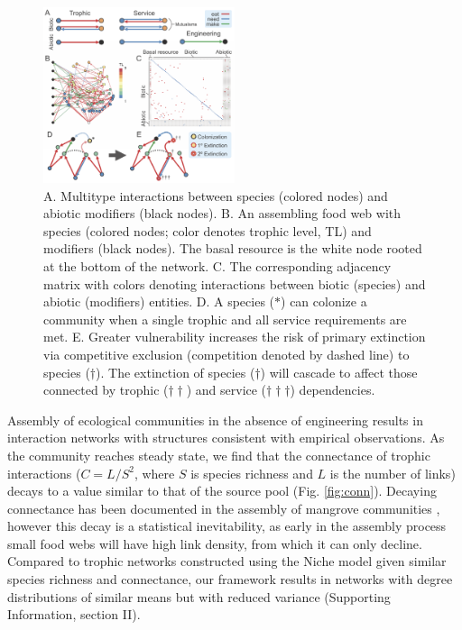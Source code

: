 \documentclass[twocolumn,preprintnumbers,amsmath,amssymb,superscriptaddress]{revtex4}
\begin{document}
\begin{figure}[h!]
\centering
\includegraphics[width=0.5\textwidth]{fig_model.png}
\vspace{-6mm}
\caption{
A. Multitype interactions between species (colored nodes) and abiotic modifiers (black nodes).
B. An assembling food web with species (colored nodes; color denotes trophic level, TL) and modifiers (black nodes). The basal resource is the white node rooted at the bottom of the network.
C. The corresponding adjacency matrix with colors denoting interactions between biotic (species) and abiotic (modifiers) entities.
D. A species ($\ast$) can colonize a community when a single trophic and all service requirements are met.
E. Greater vulnerability increases the risk of primary extinction via competitive exclusion (competition denoted by dashed line) to species ($\dag$).
The extinction of species ($\dag$) will cascade to affect those connected by trophic ($\dag \dag$) and service ($\dag \dag \dag$) dependencies. 
\vspace{-3mm}
}
\vspace{-3mm}
\label{fig:model}
\end{figure}

Assembly of ecological communities in the absence of engineering results in interaction networks with structures consistent with empirical observations.
As the community reaches steady state, we find that the connectance of trophic interactions ($C=L/S^2$, where $S$ is species richness and $L$ is the number of links) decays to a value similar to that of the source pool (Fig. \ref{fig:conn}).
Decaying connectance has been documented in the assembly of mangrove communities \cite{Piechnik2008}, however this decay is a statistical inevitability, as early in the assembly process small food webs will have high link density, from which it can only decline.
Compared to trophic networks constructed using the Niche model \cite{Williams2000} given similar species richness and connectance, our framework results in networks with degree distributions of similar means but with reduced variance (Supporting Information, section II).
\end{document}
